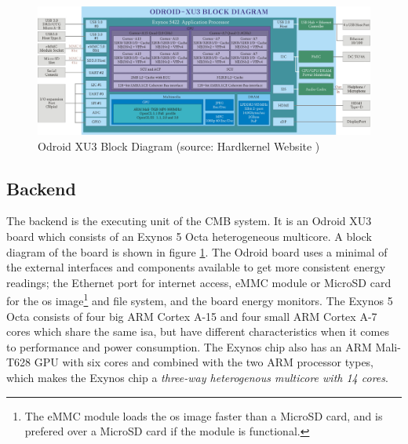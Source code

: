 \begin{figure}
    \includegraphics[width=1.0\textwidth]{figs/block-xu3.jpg}
    \caption[Odroid XU3 Block Diagram]{Odroid XU3 Block Diagram (source: Hardkernel Website \cite{XU3-BLOCK})}
    \label{fig:odroid-block}
\end{figure}

\subsection{Backend}
\label{subsec:cmb-arch-backend}
The backend is the executing unit of the CMB system. It is an Odroid XU3 board \cite{XU3} which consists of an Exynos 5 Octa heterogeneous multicore. A block diagram of the board is shown in figure \ref{fig:odroid-block}.  The Odroid board uses a minimal of the external interfaces and components available to get more consistent energy readings; the Ethernet port for internet access, eMMC module or MicroSD card for the \gls{os} image\footnote{The eMMC module loads the \gls{os} image faster than a MicroSD card, and is prefered over a MicroSD card if the module is functional.} and file system, and the board energy monitors. The Exynos 5 Octa consists of four big ARM Cortex A-15 and four small ARM Cortex A-7 cores which share the same \gls{isa}, but have different characteristics when it comes to performance and power consumption. The Exynos chip also has an ARM Mali-T628 GPU with six cores and combined with the two ARM processor types, which makes the Exynos chip a \textit{three-way heterogenous multicore with 14 cores}. \\

